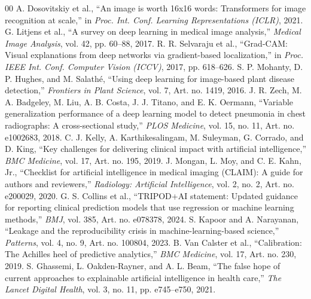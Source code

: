 \documentclass[conference]{IEEEtran}
\begin{document}
\begin{thebibliography}{00}
 A. Dosovitskiy et al., ``An image is worth 16x16 words: Transformers for image recognition at scale,'' in \textit{Proc. Int. Conf. Learning Representations (ICLR)}, 2021.
 G. Litjens et al., ``A survey on deep learning in medical image analysis,'' \textit{Medical Image Analysis}, vol. 42, pp. 60--88, 2017.
 R. R. Selvaraju et al., ``Grad-CAM: Visual explanations from deep networks via gradient-based localization,'' in \textit{Proc. IEEE Int. Conf. Computer Vision (ICCV)}, 2017, pp. 618--626.
 S. P. Mohanty, D. P. Hughes, and M. Salath\'e, ``Using deep learning for image-based plant disease detection,'' \textit{Frontiers in Plant Science}, vol. 7, Art. no. 1419, 2016.
 J. R. Zech, M. A. Badgeley, M. Liu, A. B. Costa, J. J. Titano, and E. K. Oermann, ``Variable generalization performance of a deep learning model to detect pneumonia in chest radiographs: A cross-sectional study,'' \textit{PLOS Medicine}, vol. 15, no. 11, Art. no. e1002683, 2018.
 C. J. Kelly, A. Karthikesalingam, M. Suleyman, G. Corrado, and D. King, ``Key challenges for delivering clinical impact with artificial intelligence,'' \textit{BMC Medicine}, vol. 17, Art. no. 195, 2019.
 J. Mongan, L. Moy, and C. E. Kahn, Jr., ``Checklist for artificial intelligence in medical imaging (CLAIM): A guide for authors and reviewers,'' \textit{Radiology: Artificial Intelligence}, vol. 2, no. 2, Art. no. e200029, 2020.
 G. S. Collins et al., ``TRIPOD+AI statement: Updated guidance for reporting clinical prediction models that use regression or machine learning methods,'' \textit{BMJ}, vol. 385, Art. no. e078378, 2024.
 S. Kapoor and A. Narayanan, ``Leakage and the reproducibility crisis in machine-learning-based science,'' \textit{Patterns}, vol. 4, no. 9, Art. no. 100804, 2023.
 B. Van Calster et al., ``Calibration: The Achilles heel of predictive analytics,'' \textit{BMC Medicine}, vol. 17, Art. no. 230, 2019.
 S. Ghassemi, L. Oakden-Rayner, and A. L. Beam, ``The false hope of current approaches to explainable artificial intelligence in health care,'' \textit{The Lancet Digital Health}, vol. 3, no. 11, pp. e745--e750, 2021.
\end{thebibliography}
\end{document}
